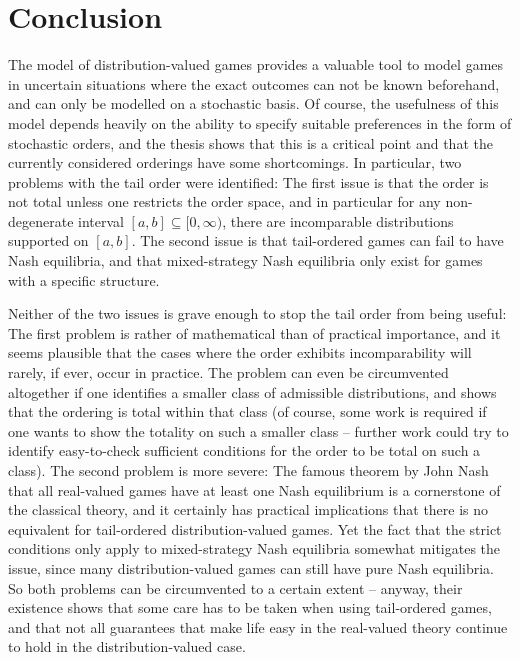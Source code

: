 \documentclass[a4paper]{scrreprt}
\theoremstyle{definition}
\begin{document}
    
    \chapter{Conclusion}
    The model of distribution-valued games provides a valuable tool to model games in uncertain situations where the exact outcomes can not be known beforehand, and can only be modelled on a stochastic basis. Of course, the usefulness of this model depends heavily on the ability to specify suitable preferences in the form of stochastic orders, and the thesis shows that this is a critical point and that the currently considered orderings have some shortcomings. In particular, two problems with the tail order were identified: The first issue is that the order is not total unless one restricts the order space, and in particular for any non-degenerate interval $[a, b] \subseteq [0, \infty)$, there are incomparable distributions supported on $[a, b]$. The second issue is that tail-ordered games can fail to have Nash equilibria, and that mixed-strategy Nash equilibria only exist for games with a specific structure. 
    
    Neither of the two issues is grave enough to stop the tail order from being useful: The first problem is rather of mathematical than of practical importance, and it seems plausible that the cases where the order exhibits incomparability will rarely, if ever, occur in practice. The problem can even be circumvented altogether if one identifies a smaller class of admissible distributions, and shows that the ordering is total within that class (of course, some work is required if one wants to show the totality on such a smaller class -- further work could try to identify easy-to-check sufficient conditions for the order to be total on such a class). The second problem is more severe: The famous theorem by John Nash that all real-valued games have at least one Nash equilibrium is a cornerstone of the classical theory, and it certainly has practical implications that there is no equivalent for tail-ordered distribution-valued games. Yet  the fact that the strict conditions only apply to mixed-strategy Nash equilibria somewhat mitigates the issue, since many distribution-valued games can still have pure Nash equilibria.
    So both problems can be circumvented to a certain extent -- anyway, their existence shows that some care has to be taken when using tail-ordered games, and that not all guarantees that make life easy in the real-valued theory continue to hold in the distribution-valued case.
    
\end{document}
